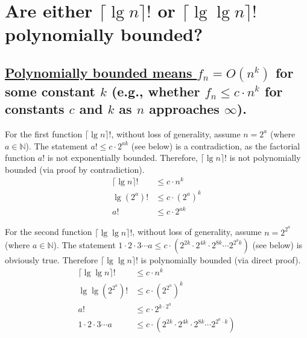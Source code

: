 \section[Problem 1]{Are either $\lceil \lg n \rceil!$ or $\lceil \lg \lg n \rceil!$ polynomially bounded?}

\subsection{\ul{Polynomially bounded means $f_n = O(n^k)$} for some constant $k$ (e.g., whether $f_n \leq c \cdot n^k$ for constants $c$ and $k$ as $n$ approaches $\infty$). }

\noindent
For the first function $\lceil \lg n \rceil!$, without loss of generality, assume $n = 2^a$ (where $a \in \mathbb{N}$). 
The statement $a! \leq c \cdot 2^{ak}$ (see below) is a contradiction, as the factorial function $a!$ is not exponentially bounded. Therefore, $\lceil \lg n \rceil!$ is not polynomially bounded (via proof by contradiction).
\begin{align*}
	\lceil \lg n \rceil ! & \leq c \cdot n^k \\
	\lg (2^a) ! & \leq c \cdot (2^a)^k \\
	a! & \leq c \cdot 2^{ak}
\end{align*}


For the second function $\lceil \lg \lg n \rceil!$, without loss of generality, assume $n = 2^{2^a}$ (where $a \in \mathbb{N}$).
The statement $1 \cdot 2 \cdot 3 \cdots a \leq c \cdot \left( 2^{2k} \cdot 2^{4k} \cdot 2^{8k} \cdots 2^{2^a k} \right)$ (see below) is obviously true. Therefore $\lceil \lg \lg n \rceil!$ is polynomially bounded (via direct proof).
\begin{align*}
	 \lceil \lg \lg n \rceil! & \leq c \cdot n^k \\
	 \lg \lg \left( 2^{2^a} \right) ! & \leq c \cdot \left( 2^{2^a} \right)^k \\
	 a! & \leq c \cdot 2^{k \cdot {2^a}} \\
	 1 \cdot 2 \cdot 3 \cdots a & \leq c \cdot \left( 2^{2k} \cdot 2^{4k} \cdot 2^{8k} \cdots 2^{2^a \cdot k} \right)
\end{align*}


